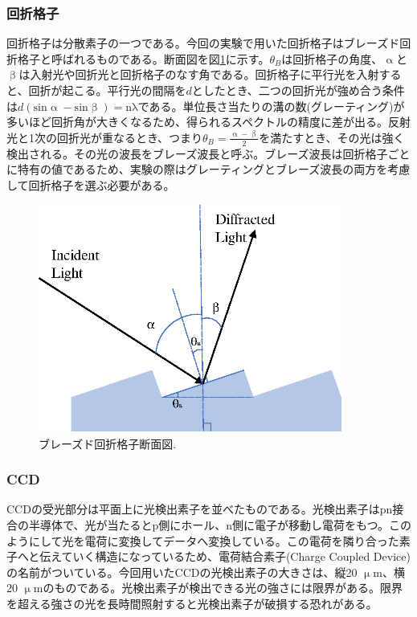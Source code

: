 \documentclass[11pt,a4j]{jsarticle}
\begin{document}
\newpage
\subsubsection{回折格子}
回折格子は分散素子の一つである。今回の実験で用いた回折格子はブレーズド回折格子と呼ばれるものである。断面図を図\ref{fig_grating1}に示す\cite{Grating}。$\theta_{B}$は回折格子の角度、$\upalpha$と$\upbeta$は入射光や回折光と回折格子のなす角である。回折格子に平行光を入射すると、回折が起こる。平行光の間隔を$d$としたとき、二つの回折光が強め合う条件は$d\mathrm{(sin\upalpha-sin\upbeta)=n\lambda}$である。単位長さ当たりの溝の数(グレーティング)が多いほど回折角が大きくなるため、得られるスペクトルの精度に差が出る。反射光と1次の回折光が重なるとき、つまり$\theta_{B}=\frac{\upalpha-\upbeta}{2}$を満たすとき、その光は強く検出される。その光の波長をブレーズ波長と呼ぶ。ブレーズ波長は回折格子ごとに特有の値であるため、実験の際はグレーティングとブレーズ波長の両方を考慮して回折格子を選ぶ必要がある。

\begin{figure}[h]
 \centering
 \includegraphics[clip,width=10cm]{grating.eps}
 \caption{ブレーズド回折格子断面図.}
 \label{fig_grating1}
\end{figure}

\subsubsection{CCD}
CCDの受光部分は平面上に光検出素子を並べたものである。光検出素子はpn接合の半導体で、光が当たるとp側にホール、n側に電子が移動し電荷をもつ。このようにして光を電荷に変換してデータへ変換している。この電荷を隣り合った素子へと伝えていく構造になっているため、電荷結合素子(Charge Coupled Device)の名前がついている\cite{CCD}。今回用いたCCDの光検出素子の大きさは、縦20 $\upmu$m、横20 $\upmu$mのものである。光検出素子が検出できる光の強さには限界がある。限界を超える強さの光を長時間照射すると光検出素子が破損する恐れがある。%
\end{document}
